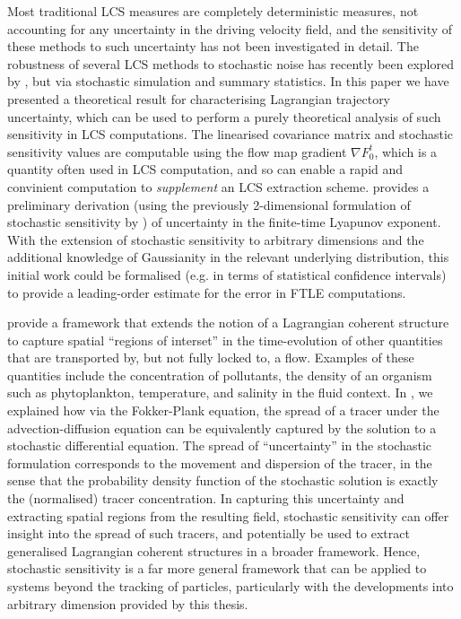 Most traditional LCS measures are completely deterministic measures, not accounting for any uncertainty in the driving velocity field, and the sensitivity of these methods to such uncertainty has not been investigated in detail.
The robustness of several LCS methods to stochastic noise has recently been explored by \citet{BadzaEtAl_2023_HowSensitiveAre}, but via stochastic simulation and summary statistics.
In this paper we have presented a theoretical result for characterising Lagrangian trajectory uncertainty, which can be used to perform a purely theoretical analysis of such sensitivity in LCS computations.
The linearised covariance matrix and stochastic sensitivity values are computable using the flow map gradient \(\nabla F_0^t\), which is a quantity often used in LCS computation, and so can enable a rapid and convinient computation to \emph{supplement} an LCS extraction scheme.
\citet{Balasuriya_2020_UncertaintyFinitetimeLyapunov} provides a preliminary derivation (using the previously 2-dimensional formulation of stochastic sensitivity by \citet{Balasuriya_2020_StochasticSensitivityComputable}) of uncertainty in the finite-time Lyapunov exponent.
With the extension of stochastic sensitivity to arbitrary dimensions and the additional knowledge of Gaussianity in the relevant underlying distribution, this initial work could be formalised (e.g. in terms of statistical confidence intervals) to provide a leading-order estimate for the error in FTLE computations.

\citet{BalasuriyaEtAl_2018_GeneralizedLagrangianCoherent} provide a framework that extends the notion of a Lagrangian coherent structure to capture spatial ``regions of interset'' in the time-evolution of other quantities that are transported by, but not fully locked to, a flow.
Examples of these quantities include the concentration of pollutants, the density of an organism such as phytoplankton, temperature, and salinity in the fluid context.
In , we explained how via the Fokker-Plank equation, the spread of a tracer under the advection-diffusion equation can be equivalently captured by the solution to a stochastic differential equation.
The spread of ``uncertainty'' in the stochastic formulation corresponds to the movement and dispersion of the tracer, in the sense that the probability density function of the stochastic solution is exactly the (normalised) tracer concentration.
In capturing this uncertainty and extracting spatial regions from the resulting field, stochastic sensitivity can offer insight into the spread of such tracers, and potentially be used to extract generalised Lagrangian coherent structures in a broader framework.
Hence, stochastic sensitivity is a far more general framework that can be applied to systems beyond the tracking of particles, particularly with the developments into arbitrary dimension provided by this thesis.

